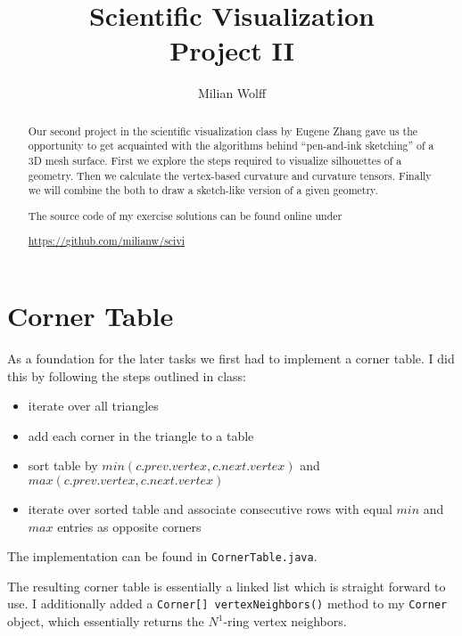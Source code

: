 \documentclass[a4paper,10pt,notitlepage]{scrreprt}
\title{Scientific Visualization\\Project II}
\author{Milian Wolff}
\begin{document}
\maketitle

\begin{abstract}
Our second project in the scientific visualization class by Eugene Zhang gave
us the opportunity to get acquainted with the algorithms behind ``pen-and-ink
sketching'' of a 3D mesh surface. First we explore the steps required to
visualize silhouettes of a geometry. Then we calculate the vertex-based
curvature and curvature tensors. Finally we will combine the both to draw a
sketch-like version of a given geometry.

The source code of my exercise solutions can be found online under

\begin{center}\url{https://github.com/milianw/scivi}\end{center}
\end{abstract}

\begingroup
\let\clearpage\relax

\tableofcontents
\endgroup

\chapter{Corner Table}

As a foundation for the later tasks we first had to implement a corner table. I
did this by following the steps outlined in class:

\begin{itemize}
 \item iterate over all triangles
 \item add each corner in the triangle to a table
 \item sort table by $min(c.prev.vertex, c.next.vertex)$ and
$max(c.prev.vertex, c.next.vertex)$
 \item iterate over sorted table and associate consecutive rows with equal
$min$ and $max$ entries as opposite corners
\end{itemize}

The implementation can be found in \texttt{CornerTable.java}.

The resulting corner table is essentially a linked list which is straight
forward to use. I additionally added a \texttt{Corner[] vertexNeighbors()}
method to my \texttt{Corner} object, which essentially returns the $N^1$-ring
vertex neighbors.
\end{document}
